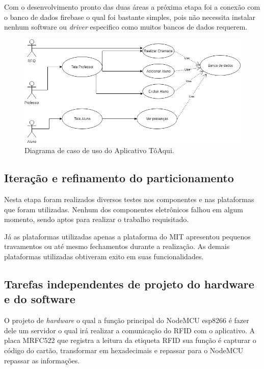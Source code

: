 \documentclass[12pt]{article}
\begin{document}
Com o desenvolvimento pronto das duas áreas a próxima etapa foi a conexão com o banco de dados firebase o qual foi bastante simples, pois não necessita instalar nenhum software ou \textit{driver} especifico como muitos bancos de dados requerem.

\begin{figure}[H]
\centering
\includegraphics[scale=.50]{TCC-APP.png}
\caption{Diagrama de caso de uso do Aplicativo TôAqui.}
\end{figure}

\subsection{Iteração e refinamento do particionamento}
Nesta etapa foram realizados diversos testes nos componentes e nas plataformas que foram utilizadas. Nenhum dos componentes eletrônicos falhou em algum momento, sendo aptos para realizar o trabalho requisitado.

Já as plataformas utilizadas apenas a plataforma do MIT apresentou pequenos travamentos ou até mesmo fechamentos durante a realização. As demais plataformas utilizadas obtiveram exito em suas funcionalidades.

\subsection{Tarefas independentes de projeto do hardware e do software}
O projeto de \textit{hardware} o qual a função principal do NodeMCU esp8266 é fazer dele um servidor o qual irá realizar a comunicação do RFID com o aplicativo.
A placa MRFC522 que registra a leitura da etiqueta RFID sua função é capturar o código do cartão, transformar em hexadecimais e repassar para o NodeMCU repassar as informações.
\end{document}

